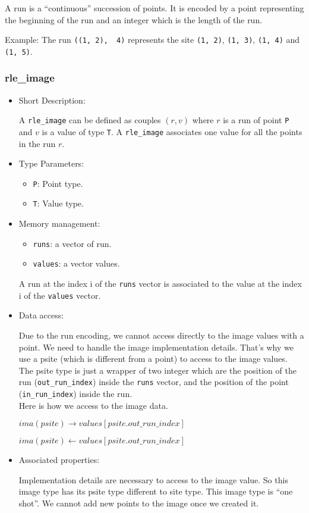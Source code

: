A run is a ``continuous'' succession of points.
It is encoded by a point representing the beginning of the run
and an integer which is the length of the run.

Example:
The run \verb+((1, 2),  4)+ represents the site \verb+(1, 2)+, \verb+(1, 3)+,
\verb+(1, 4)+ and \verb+(1, 5)+.


\subsubsection{rle\_image}

\begin{itemize}
\item{Short Description:}

A \verb+rle_image+ can be defined as couples $(r, v)$ where $r$ is a run of
point \verb+P+ and $v$ is a value of type \verb+T+.
A \verb+rle_image+ associates one value for all the points in the run $r$.

\item{Type Parameters:}

\begin{itemize}
\item \verb+P+: Point type.
\item \verb+T+: Value type.
\end{itemize}

\item{Memory management:}

\begin{itemize}
\item \verb+runs+: a vector of run.
\item \verb+values+: a vector values.
\end{itemize}

A run at the index i of the \verb+runs+ vector is associated to the value at 
the index i of the \verb+values+ vector.


\item{Data access:}

Due to the run encoding, we cannot access directly to the image values with
a point.
We need to handle the image implementation details.
That's why we use a psite (which is different from a point) to access to
the image values.
The psite type is just a wrapper of two integer which are the position of
the run (\verb+out_run_index+) inside the \verb+runs+ vector, and the position
of the point (\verb+in_run_index+) inside the run.\\


Here is how we access to the image data.

$ima(psite) \rightarrow values[psite.out\_run\_index]$

$ima(psite) \leftarrow values[psite.out\_run\_index]$


\item{Associated properties:}

Implementation details are necessary to access to the image value.
So this image type has its psite type different to site type.
This image type is ``one shot''.
We cannot add new points to the image once we created it.
\end{itemize}


